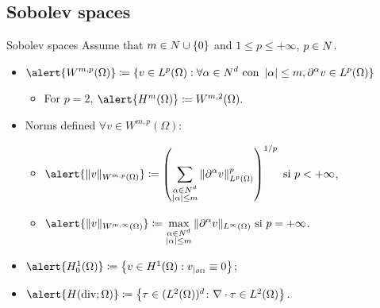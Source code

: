 \subsection{Sobolev spaces}
\begin{frame}{Sobolev spaces}
Assume that $m\in\relax N\cup\left\{0\right\}$ and $1\leq p\leq+\infty$, $p\in\relax N$.
\begin{itemize}\itemsep1em
	\item$\displaystyle\alert{W^{m,p}(\Omega)}\coloneqq\{v\in L^p(\Omega):\forall\alpha\in\N^d\mbox{ con }\left|\alpha\right|\leq m, \partial^\alpha v\in L^p(\Omega)\}$
	\begin{itemize}\itemsep1em
		\item For $p=2$, $\alert{H^{m}(\Omega)}\coloneqq W^{m,2}(\Omega).$
	\end{itemize}
	
	\item Norms defined $\forall v\in W^{m,p}(\Omega)$:
	\begin{itemize}\itemsep1em
		\item $\displaystyle \alert{\|v\|_{W^{m,p}(\Omega)}}\coloneqq\left(\suma{\substack{\alpha\in\N^d \\ \left|\alpha\right|\leq m}}{}\|\partial^\alpha v\|^p_{L^p(\Omega)}\right)^{1/p}\text{ si }p<+\infty$,
		\item $\displaystyle \alert{\|v\|_{W^{m,\infty}(\Omega)}}\coloneqq\max_{\substack{\alpha\in\N^d \\ \left|\alpha\right|\leq m}}{}\|\partial^\alpha v\|_{L^\infty(\Omega)}\text{ si }p=+\infty$.
	\end{itemize}
	
	\item $\alert{H_0^1(\Omega)}\coloneqq\left\{v\in H^1(\Omega):v_{|_{\partial\Omega}}\equiv 0\right\}$;
	\item $\alert{H(\text{div};\Omega)}\coloneqq\left\{\tau\in(L^2(\Omega))^d\colon\nabla\cdot\tau\in L^2(\Omega) \right\}.$
	
\end{itemize}

\end{frame}

